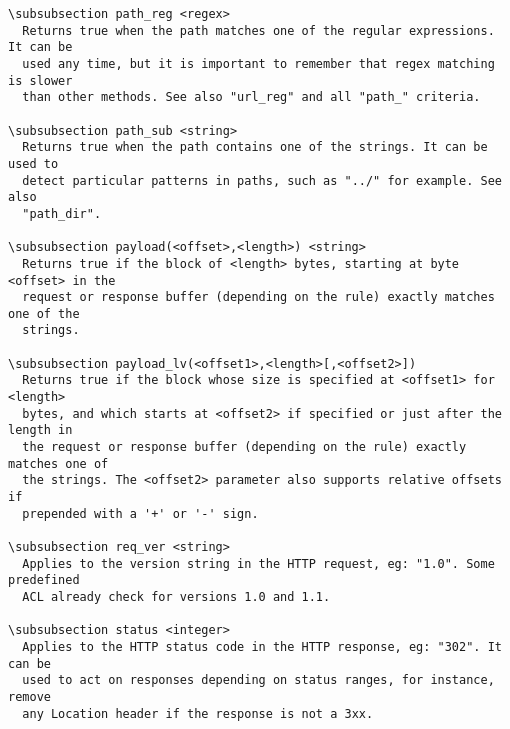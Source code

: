 \begin{verbatim}
\subsubsection path_reg <regex>
  Returns true when the path matches one of the regular expressions. It can be
  used any time, but it is important to remember that regex matching is slower
  than other methods. See also "url_reg" and all "path_" criteria.

\subsubsection path_sub <string>
  Returns true when the path contains one of the strings. It can be used to
  detect particular patterns in paths, such as "../" for example. See also
  "path_dir".

\subsubsection payload(<offset>,<length>) <string>
  Returns true if the block of <length> bytes, starting at byte <offset> in the
  request or response buffer (depending on the rule) exactly matches one of the
  strings.

\subsubsection payload_lv(<offset1>,<length>[,<offset2>])
  Returns true if the block whose size is specified at <offset1> for <length>
  bytes, and which starts at <offset2> if specified or just after the length in
  the request or response buffer (depending on the rule) exactly matches one of
  the strings. The <offset2> parameter also supports relative offsets if
  prepended with a '+' or '-' sign.

\subsubsection req_ver <string>
  Applies to the version string in the HTTP request, eg: "1.0". Some predefined
  ACL already check for versions 1.0 and 1.1.

\subsubsection status <integer>
  Applies to the HTTP status code in the HTTP response, eg: "302". It can be
  used to act on responses depending on status ranges, for instance, remove
  any Location header if the response is not a 3xx.


\end{verbatim}
